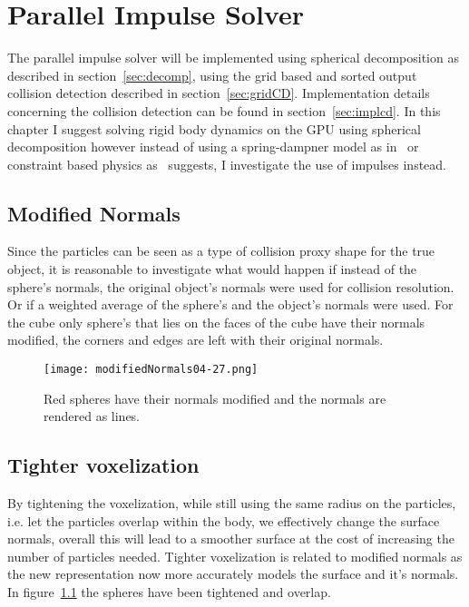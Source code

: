 \chapter{Parallel Impulse Solver}\label{cha:impl}
The parallel impulse solver will be implemented using spherical decomposition as
 described in section~\ref{sec:decomp}, using the grid based and sorted output
 collision detection described in section~\ref{sec:gridCD}. Implementation details
 concerning the collision detection can be found in section~\ref{sec:implcd}.
In this chapter I suggest solving rigid body dynamics on the GPU using spherical decomposition
however instead of using a spring-dampner model as in~\cite{gpugems} or constraint
based physics as~\cite{flex} suggests, I investigate the use of impulses instead.

\section{Modified Normals}\label{sec:modnorm}
Since the particles can be seen as a type of collision proxy shape for the true object,
it is reasonable to investigate what would happen if instead of the sphere's normals,
the original object's normals were used for collision resolution. Or if a weighted
average of the sphere's and the object's normals were used. For the cube only
sphere's that lies on the faces of the cube have their normals modified, the corners
and edges are left with their original normals.

\begin{figure}[H]
  \centering
  \texttt{[image: modifiedNormals04-27.png]}
  \caption{Red spheres have their normals modified and the normals are rendered as lines.}
  \label{fig:modnorm}
\end{figure}

\section{Tighter voxelization}
By tightening the voxelization, while still using the same radius on the particles,
i.e. let the particles overlap within the body, we effectively change the surface
normals, overall this will lead to a smoother surface at the cost of increasing the number
of particles needed. Tighter voxelization is related to modified normals as the new
representation now more accurately models the surface and it's normals. In figure~\ref{fig:modnorm}
the spheres have been tightened and overlap.

